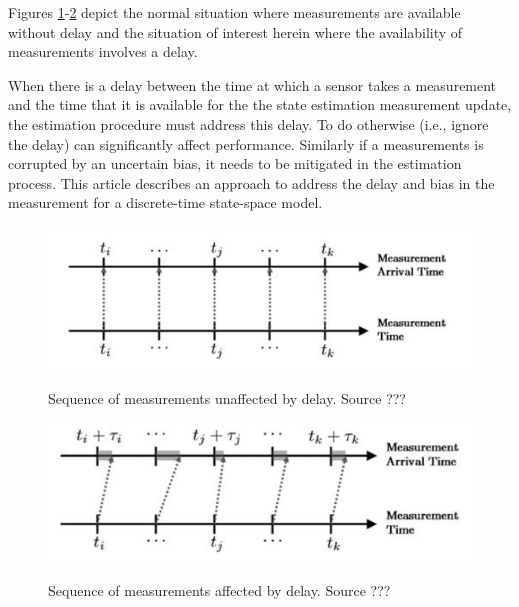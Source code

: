 Figures \ref{fig:undelayed_measurement}-\ref{fig:delayed_measurement} depict the normal situation where measurements are available without delay and the situation of interest herein where the availability of measurements involves a delay.

When there is a delay between the time at which a sensor takes a measurement 
and the time that it is available for the the state estimation measurement update, the estimation procedure must address this delay.
To do otherwise (i.e., ignore the delay) can significantly affect performance.
Similarly if a measurements is corrupted by an uncertain bias, it needs to be mitigated in the estimation process.
This article describes an approach to address the delay and bias in the measurement for a discrete-time state-space model.

\begin{figure}[b]
	{\includegraphics[width=1.0\columnwidth]{./img/undelayed_measurement.png}}
	\caption{Sequence of measurements unaffected by delay. \red Source ???}
	\label{fig:undelayed_measurement}
\end{figure} 

\begin{figure}[b]
	{\includegraphics[width=1.0\columnwidth]{./img/delayed_measurement.png}}
	\caption{Sequence of measurements affected by delay. \red Source ???}
	\label{fig:delayed_measurement}
\end{figure} 


 